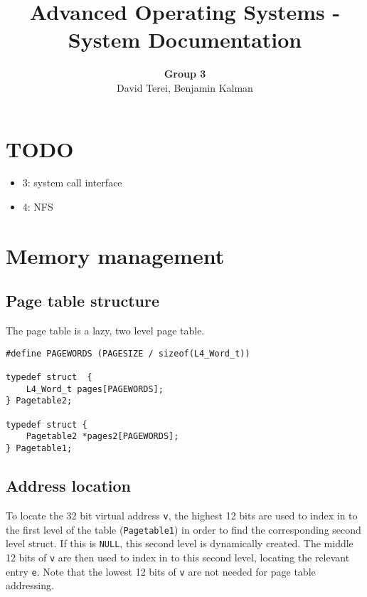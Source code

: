 \documentclass[12pt,english]{article}
\begin{document}

\title{Advanced Operating Systems - System Documentation}
\author{\textbf{Group 3} \\ David Terei, Benjamin Kalman}
\maketitle

\tableofcontents{}


\newpage{}
\section{TODO}

\begin{itemize}
\item 3: system call interface
\item 4: NFS
\end{itemize}


\section{Memory management}

\subsection{Page table structure}

The page table is a lazy, two level page table.  

\begin{verbatim}
#define PAGEWORDS (PAGESIZE / sizeof(L4_Word_t))

typedef struct  {
    L4_Word_t pages[PAGEWORDS];
} Pagetable2;

typedef struct {
    Pagetable2 *pages2[PAGEWORDS];
} Pagetable1;
\end{verbatim}

\subsection{Address location}

To locate the 32 bit virtual address \texttt{v}, the highest 12 bits are used to index in to the first level of the table (\texttt{Pagetable1}) in order to find the corresponding second level struct.  If this is \texttt{NULL}, this second level is dynamically created.  The middle 12 bits of \texttt{v} are then used to index in to this second level, locating the relevant entry \texttt{e}.  Note that the lowest 12 bits of \texttt{v} are not needed for page table addressing.
\end{document}
